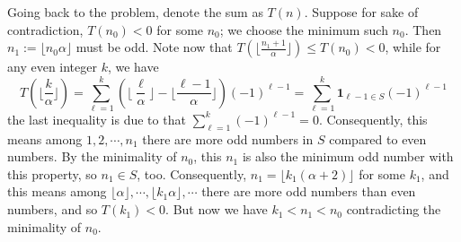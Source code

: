 \documentclass[11pt,a4paper]{article}
\newcommand{\<}{\langle}
\renewcommand{\>}{\rangle}
\begin{document}
\begin{enumerate}
	Going back to the problem, denote the sum as $T(n)$. 
	Suppose for sake of contradiction, $T(n_0) < 0$ for some $n_0$; we choose the minimum such $n_0$. 
	Then $n_1 := \lfloor n_0\alpha\rfloor$ must be odd. 
	Note now that $T(\lfloor \frac{n_1+1}{\alpha}\rfloor)\le T(n_0) < 0$, 
	while for any even integer $k$, we have 
	\[
	T(\lfloor \frac{k}{\alpha}\rfloor) = \sum_{\ell = 1}^{k} (\lfloor \frac{\ell}{\alpha}\rfloor - \lfloor \frac{\ell - 1}{\alpha}\rfloor)(-1)^{\ell - 1}
	=\sum_{\ell = 1}^{k} \boldsymbol{1}_{\ell - 1\in S}(-1)^{\ell - 1}
	\]
	the last inequality is due to that $\sum_{\ell = 1}^{k} (-1)^{\ell - 1}=0$. 
	Consequently, this means among $1, 2, \cdots, n_1$ there are more odd numbers in $S$ compared to even numbers. 
	By the minimality of $n_0$, this $n_1$ is also the minimum odd number with this property, so $n_1\in S$, too. 
	Consequently, $n_1=\lfloor k_1(\alpha + 2)\rfloor$ for some $k_1$, 
	and this means among $\lfloor \alpha\rfloor, \cdots, \lfloor k_1\alpha\rfloor, \cdots$ there are more odd numbers than even numbers, and so $T(k_1) < 0$. 
	But now we have 
	$
	k_1 < n_1 < n_0
	$
	contradicting the minimality of $n_0$. 
\end{enumerate}
\end{document}
